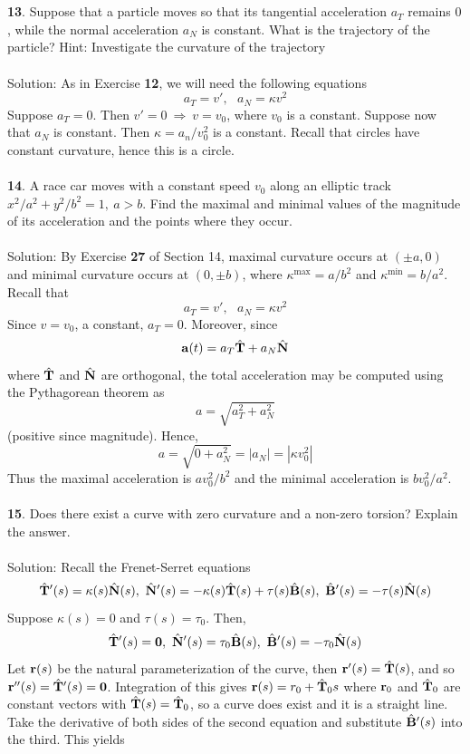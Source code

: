 \documentclass[12pt]{amsbook}
\begin{document}
\\
\\
{\small\bf 13}. Suppose that a particle moves so that its tangential acceleration $a_T$ remains $0$, while the normal acceleration $a_N$ is
constant. What is the trajectory
of the particle? Hint: Investigate the curvature of the trajectory
\\
\\
{\sc Solution}: As in Exercise {\bf 12}, we will need the following equations 
$$a_T=v', \ \ \ a_N=\kappa v^2 $$
Suppose $a_T=0$. Then $v'=0 \ \Rightarrow \ v=v_0$, where $v_0$ is a constant. Suppose now that $a_N$ is constant. Then $\kappa=a_n/v_0^2$ is a constant. Recall that circles have constant curvature, hence this is a circle.
\\
\\
{\small\bf 14}. A race car moves with a constant speed $v_0$ along an elliptic track $x^2/a^2+y^2/b^2=1, \ a>b$. Find the maximal and minimal values of the magnitude of its acceleration and the points where they occur.
\\
\\
{\sc Solution}: By Exercise {\bf 27} of Section 14, maximal curvature occurs at $(\pm a,0)$ and minimal curvature occurs at $(0, \pm b)$, where $\kappa^{\text{max}}=a/b^2$ and $\kappa^{\text{min}}=b/a^2$. Recall that
$$a_T=v', \ \ \ a_N=\kappa v^2$$
Since $v=v_0$, a constant, $a_T=0$. Moreover, since 
$${\bf a}(t)=a_T\hat{\bf T}+a_N\hat{\bf N}$$
where $\hat{\bf T}$ and $\hat{\bf N}$ are orthogonal, the total acceleration may be computed using the Pythagorean theorem as 
$$a=\sqrt{a_T^2+a_N^2}$$
(positive since magnitude). Hence,
$$a=\sqrt{0+a_N^2}=|a_N|=|\kappa v_0^2|$$
Thus the maximal acceleration is $av_0^2/b^2$ and the minimal acceleration is $bv_0^2/a^2$.  
\\
\\
{\small\bf 15}. Does there exist a curve with zero curvature and a non-zero torsion?
Explain the answer.
\\
\\
{\sc Solution}: Recall the Frenet-Serret equations
$$\hat{\bf T}'(s)=\kappa(s)\hat{\bf N}(s), \ \hat{\bf N}'(s)=-\kappa(s)\hat{\bf T}(s)+\tau(s)\hat{\bf B}(s), \ \hat{\bf B}'(s)=-\tau(s)\hat{\bf N}(s)$$
Suppose $\kappa(s)=0$ and $\tau(s)=\tau_0$. Then,
$$\hat{\bf T}'(s)={\bf 0}, \ \hat{\bf N}'(s)=\tau_0\hat{\bf B}(s), \ \hat{\bf B}'(s)=-\tau_0\hat{\bf N}(s)$$
Let ${\bf r}(s)$ be the natural parameterization of the curve, then ${\bf r}'(s)=\hat{\bf T}(s)$, and so ${\bf r}''(s)=\hat{\bf T}'(s)={\bf 0}$. Integration of this gives ${\bf r}(s)=r_0+\hat{\bf T}_0s$ where ${\bf r}_0$ and $\hat{\bf T}_0$ are constant vectors with $\hat{\bf T}(s)=\hat{\bf T}_0$, so a curve does exist and it is a straight line. Take the derivative of both sides of the second equation and substitute $\hat{\bf B}'(s)$ into the third. This yields
\end{document}
